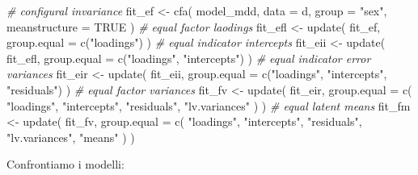 \documentclass[
  11pt,
]{krantz}
\makeatletter
\newenvironment{Shaded}{\begin{snugshade}}{\end{snugshade}}
\newcommand{\AttributeTok}[1]{\textcolor[rgb]{0.61,0.61,0.61}{#1}}
\newcommand{\CommentTok}[1]{\textcolor[rgb]{0.37,0.37,0.37}{\textit{#1}}}
\newcommand{\ConstantTok}[1]{\textcolor[rgb]{0,0,0}{#1}}
\newcommand{\FunctionTok}[1]{\textcolor[rgb]{0,0,0}{#1}}
\newcommand{\NormalTok}[1]{#1}
\newcommand{\OtherTok}[1]{\textcolor[rgb]{0.37,0.37,0.37}{#1}}
\newcommand{\StringTok}[1]{\textcolor[rgb]{0.5,0.5,0.5}{#1}}
\newenvironment{kframe}{%
\medskip{}
\setlength{\fboxsep}{.8em}
 \def\at@end@of@kframe{}%
 \ifinner\ifhmode%
  \def\at@end@of@kframe{\end{minipage}}%
  \begin{minipage}{\columnwidth}%
 \fi\fi%
 \def\FrameCommand##1{\hskip\@totalleftmargin \hskip-\fboxsep
 \colorbox{shadecolor}{##1}\hskip-\fboxsep
     \hskip-\linewidth \hskip-\@totalleftmargin \hskip\columnwidth}%
 \MakeFramed {\advance\hsize-\width
   \@totalleftmargin\z@ \linewidth\hsize
   \@setminipage}}%
 {\par\unskip\endMakeFramed%
 \at@end@of@kframe}
\renewenvironment{Shaded}{\begin{kframe}}{\end{kframe}}
\theoremstyle{definition}
\theoremstyle{definition}
\theoremstyle{definition}
\theoremstyle{definition}
\theoremstyle{remark}
\makeatother
\begin{document}
\begin{Shaded}
\begin{Highlighting}[]
\CommentTok{\# configural invariance}
\NormalTok{fit\_ef }\OtherTok{\textless{}{-}} \FunctionTok{cfa}\NormalTok{(}
\NormalTok{  model\_mdd,}
  \AttributeTok{data =}\NormalTok{ d,}
  \AttributeTok{group =} \StringTok{"sex"}\NormalTok{,}
  \AttributeTok{meanstructure =} \ConstantTok{TRUE}
\NormalTok{)}
\CommentTok{\# equal factor laodings}
\NormalTok{fit\_efl }\OtherTok{\textless{}{-}} \FunctionTok{update}\NormalTok{(}
\NormalTok{  fit\_ef,}
  \AttributeTok{group.equal =} \FunctionTok{c}\NormalTok{(}\StringTok{"loadings"}\NormalTok{)}
\NormalTok{)}
\CommentTok{\# equal indicator intercepts}
\NormalTok{fit\_eii }\OtherTok{\textless{}{-}} \FunctionTok{update}\NormalTok{(}
\NormalTok{  fit\_efl,}
  \AttributeTok{group.equal =} \FunctionTok{c}\NormalTok{(}\StringTok{"loadings"}\NormalTok{, }\StringTok{"intercepts"}\NormalTok{)}
\NormalTok{)}
\CommentTok{\# equal indicator error variances}
\NormalTok{fit\_eir }\OtherTok{\textless{}{-}} \FunctionTok{update}\NormalTok{(}
\NormalTok{  fit\_eii,}
  \AttributeTok{group.equal =} \FunctionTok{c}\NormalTok{(}\StringTok{"loadings"}\NormalTok{, }\StringTok{"intercepts"}\NormalTok{, }\StringTok{"residuals"}\NormalTok{)}
\NormalTok{)}
\CommentTok{\# equal factor variances}
\NormalTok{fit\_fv }\OtherTok{\textless{}{-}} \FunctionTok{update}\NormalTok{(}
\NormalTok{  fit\_eir,}
  \AttributeTok{group.equal =} \FunctionTok{c}\NormalTok{(}
    \StringTok{"loadings"}\NormalTok{, }\StringTok{"intercepts"}\NormalTok{, }\StringTok{"residuals"}\NormalTok{,}
    \StringTok{"lv.variances"}
\NormalTok{  )}
\NormalTok{)}
\CommentTok{\# equal latent means}
\NormalTok{fit\_fm }\OtherTok{\textless{}{-}} \FunctionTok{update}\NormalTok{(}
\NormalTok{  fit\_fv,}
  \AttributeTok{group.equal =} \FunctionTok{c}\NormalTok{(}
    \StringTok{"loadings"}\NormalTok{, }\StringTok{"intercepts"}\NormalTok{, }\StringTok{"residuals"}\NormalTok{,}
    \StringTok{"lv.variances"}\NormalTok{, }\StringTok{"means"}
\NormalTok{  )}
\NormalTok{)}
\end{Highlighting}
\end{Shaded}

Confrontiamo i modelli:
\end{document}
